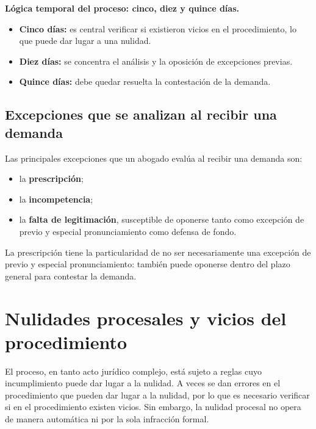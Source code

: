 \documentclass[12pt,oneside]{book}
\begin{document}
\begin{important}
\textbf{Lógica temporal del proceso: cinco, diez y quince días.}
\begin{itemize}
    \item \textbf{Cinco días:} es central verificar si existieron vicios en el procedimiento, lo que puede dar lugar a una nulidad.
    \item \textbf{Diez días:} se concentra el análisis y la oposición de excepciones previas.
    \item \textbf{Quince días:} debe quedar resuelta la contestación de la demanda.
\end{itemize}
\end{important}

\subsection{Excepciones que se analizan al recibir una demanda}

Las principales excepciones que un abogado evalúa al recibir una demanda son:

\begin{itemize}
    \item la \textbf{prescripción};
    \item la \textbf{incompetencia};
    \item la \textbf{falta de legitimación}, susceptible de oponerse tanto como excepción de previo y especial pronunciamiento como defensa de fondo.
\end{itemize}

La prescripción tiene la particularidad de no ser necesariamente una excepción de previo y especial pronunciamiento: también puede oponerse dentro del plazo general para contestar la demanda.

\section{Nulidades procesales y vicios del procedimiento}

El proceso, en tanto acto jurídico complejo, está sujeto a reglas cuyo incumplimiento puede dar lugar a la nulidad. A veces se dan errores en el procedimiento que pueden dar lugar a la nulidad, por lo que es necesario verificar si en el procedimiento existen vicios. Sin embargo, la nulidad procesal no opera de manera automática ni por la sola infracción formal.
\end{document}
